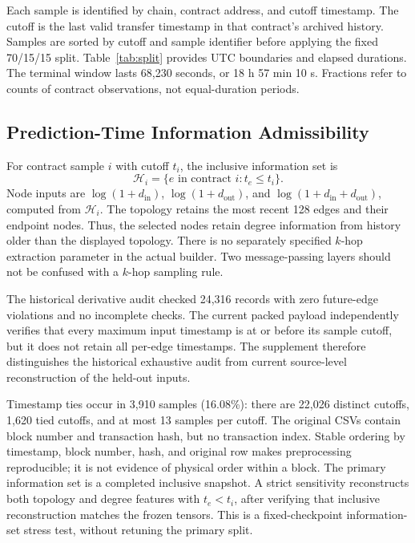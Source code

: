 \documentclass[applsci,article,submit,pdftex,moreauthors]{Definitions/mdpi}
\begin{document}
Each sample is identified by chain, contract address, and cutoff timestamp. The cutoff is the last valid transfer timestamp in that contract's archived history. Samples are sorted by cutoff and sample identifier before applying the fixed 70/15/15 split. Table~\ref{tab:split} provides UTC boundaries and elapsed durations. The terminal window lasts 68,230 seconds, or 18 h 57 min 10 s. Fractions refer to counts of contract observations, not equal-duration periods.


\subsection{Prediction-Time Information Admissibility}
For contract sample $i$ with cutoff $t_i$, the inclusive information set is
\begin{equation}
\mathcal{H}_i=\{e\text{ in contract }i:t_e\leq t_i\}.
\end{equation}
Node inputs are $\log(1+d_{\mathrm{in}})$, $\log(1+d_{\mathrm{out}})$, and $\log(1+d_{\mathrm{in}}+d_{\mathrm{out}})$, computed from $\mathcal{H}_i$. The topology retains the most recent 128 edges and their endpoint nodes. Thus, the selected nodes retain degree information from history older than the displayed topology. There is no separately specified $k$-hop extraction parameter in the actual builder. Two message-passing layers should not be confused with a $k$-hop sampling rule.

The historical derivative audit checked 24,316 records with zero future-edge violations and no incomplete checks. The current packed payload independently verifies that every maximum input timestamp is at or before its sample cutoff, but it does not retain all per-edge timestamps. The supplement therefore distinguishes the historical exhaustive audit from current source-level reconstruction of the held-out inputs.

Timestamp ties occur in 3,910 samples (16.08\%): there are 22,026 distinct cutoffs, 1,620 tied cutoffs, and at most 13 samples per cutoff. The original CSVs contain block number and transaction hash, but no transaction index. Stable ordering by timestamp, block number, hash, and original row makes preprocessing reproducible; it is not evidence of physical order within a block. The primary information set is a completed inclusive snapshot. A strict sensitivity reconstructs both topology and degree features with $t_e<t_i$, after verifying that inclusive reconstruction matches the frozen tensors. This is a fixed-checkpoint information-set stress test, without retuning the primary split.
\end{document}
